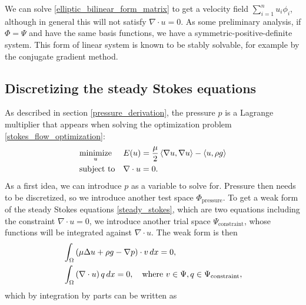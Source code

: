 We can solve \eqref{elliptic_bilinear_form_matrix} to get a velocity field $\sum_{i=1}^n u_i\phi_i$, although in general this will not satisfy $\nabla\cdot u = 0$.
As some preliminary analysis, if $\Phi = \Psi$ and have the same basis functions, we have a symmetric-positive-definite system. This form of linear system is known to be stably solvable,
for example by the conjugate gradient method.
\subsection{Discretizing the steady Stokes equations}\label{discretizing_steady_stokes}
As described in section \ref{pressure_derivation}, the pressure $p$ is a Lagrange multiplier that appears
when solving the optimization problem \eqref{stokes_flow_optimization}:
\begin{equation*}
\begin{aligned}
& \underset{u}{\text{minimize}}
& & E(u) =  \frac{\mu}{2} \left<\nabla u, \nabla u\right> - \left<u, \rho g\right>\\
& \text{subject to}
& & \nabla\cdot u = 0.
\end{aligned}
\end{equation*}
\newcommand{\trialconstraint}{{\Psi_{\text{constraint}}}}
\newcommand{\testpressure}{{\Phi_{\text{pressure}}}}
As a first idea, we can introduce $p$ as a variable to solve for.
Pressure then needs to be discretized, so we introduce another test space $\testpressure$.
To get a weak form of the steady Stokes equations \eqref{steady_stokes}, which are two equations including the constraint $\nabla\cdot u = 0$, we introduce
another trial space $\trialconstraint$, whose functions will be integrated against $\nabla\cdot u$. The weak form is then
\begin{equation*}
\begin{split}
    &\int_\om \left(\mu\Delta u + \rho g - \nabla p\right)\cdot v\,dx = 0,\\
    &\int_\om \left(\nabla\cdot u\right) q\,dx = 0, \quad\text{where $v \in \Psi, q \in \trialconstraint$},
\end{split}
\end{equation*}
which by integration by parts can be written as
